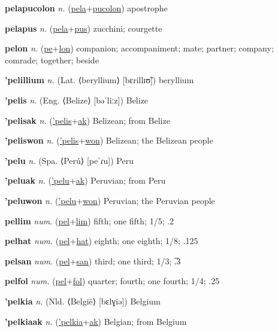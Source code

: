 \textbf{\hypertarget{pelapucolon}{pelapucolon}} \textit{n.} (\hyperlink{pela}{pela}+\allowbreak \hyperlink{pucolon}{pucolon})
apostrophe

\textbf{\hypertarget{pelapus}{pelapus}} \textit{n.} (\hyperlink{pela}{pela}+\allowbreak \hyperlink{pus}{pus})
zucchini; courgette

\textbf{\hypertarget{pelon}{pelon}} \textit{n.} (\hyperlink{pe}{pe}+\allowbreak \hyperlink{lon}{lon})
companion; accompaniment; mate; partner; company; comrade; together; beside

\textbf{\hypertarget{'pelillium}{'pelillium}} \textit{n.} (Lat. ⟨beryllium⟩ [bɛrillɪʊ̃])
beryllium

\textbf{\hypertarget{'pelis}{'pelis}} \textit{n.} (Eng. ⟨Belize⟩ [bəˈliːz])
Belize

\textbf{\hypertarget{'pelisak}{'pelisak}} \textit{n.} (\hyperlink{'pelis}{'pelis}+\allowbreak \hyperlink{ak}{ak})
Belizean; from Belize

\textbf{\hypertarget{'peliswon}{'peliswon}} \textit{n.} (\hyperlink{'pelis}{'pelis}+\allowbreak \hyperlink{won}{won})
Belizean; the Belizean people

\textbf{\hypertarget{'pelu}{'pelu}} \textit{n.} (Spa. ⟨Perú⟩ [peˈɾu])
Peru

\textbf{\hypertarget{'peluak}{'peluak}} \textit{n.} (\hyperlink{'pelu}{'pelu}+\allowbreak \hyperlink{ak}{ak})
Peruvian; from Peru

\textbf{\hypertarget{'peluwon}{'peluwon}} \textit{n.} (\hyperlink{'pelu}{'pelu}+\allowbreak \hyperlink{won}{won})
Peruvian; the Peruvian people

\textbf{\hypertarget{pellim}{pellim}} \textit{num.} (\hyperlink{pel}{pel}+\allowbreak \hyperlink{lim}{lim})
fifth; one fifth; 1/5; .2

\textbf{\hypertarget{pelhat}{pelhat}} \textit{num.} (\hyperlink{pel}{pel}+\allowbreak \hyperlink{hat}{hat})
eighth; one eighth; 1/8; .125

\textbf{\hypertarget{pelsan}{pelsan}} \textit{num.} (\hyperlink{pel}{pel}+\allowbreak \hyperlink{san}{san})
third; one third; 1/3; .̅3

\textbf{\hypertarget{pelfol}{pelfol}} \textit{num.} (\hyperlink{pel}{pel}+\allowbreak \hyperlink{fol}{fol})
quarter; fourth; one fourth; 1/4; .25

\textbf{\hypertarget{'pelkia}{'pelkia}} \textit{n.} (Nld. ⟨België⟩ [bɛlɣiə])
Belgium

\textbf{\hypertarget{'pelkiaak}{'pelkiaak}} \textit{n.} (\hyperlink{'pelkia}{'pelkia}+\allowbreak \hyperlink{ak}{ak})
Belgian; from Belgium


